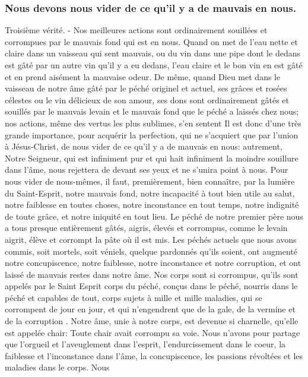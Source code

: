 \subsubsection{Nous devons nous vider de ce qu'il y a de mauvais en nous.}
 Troisième vérité. - Nos meilleures actions sont ordinairement souillées et corrompues par le mauvais fond qui
est en nous. Quand on met de l'eau nette et claire dans un vaisseau qui sent mauvais, ou du vin dans une pipe
dont le dedans est gâté par un autre vin qu'il y a eu dedans, l'eau claire et le bon vin en est gâté et en prend
aisément la mauvaise odeur. De même, quand Dieu met dans le vaisseau de notre âme gâté par le péché originel
et actuel, ses grâces et rosées célestes ou le vin délicieux de son amour, ses dons sont ordinairement gâtés et
souillés par le mauvais levain et le mauvais fond que le péché a laissés chez nous; nos actions, même des vertus
les plus sublimes, s'en sentent Il est donc d'une très grande importance, pour acquérir la perfection, qui ne
s'acquiert que par l'union à Jésus-Christ, de nous vider de ce qu'il y a de mauvais en nous: autrement, Notre
Seigneur, qui est infiniment pur et qui hait infiniment la moindre souillure dans l'âme, nous rejettera de devant ses
yeux et ne s'unira point à nous.
 Pour nous vider de nous-mêmes, il faut, premièrement, bien connaître, par la lumière du Saint-Esprit, notre
mauvais fond, notre incapacité à tout bien utile au salut, notre faiblesse en toutes choses, notre inconstance en
tout temps, notre indignité de toute grâce, et notre iniquité en tout lieu. Le péché de notre premier père nous a tous
presque entièrement gâtés, aigris, élevés et corrompus, comme le levain aigrit, élève et corrompt la pâte où il est
mis. Les péchés actuels que nous avons commis, soit mortels, soit véniels, quelque pardonnés qu'ils soient, ont
augmenté notre concupiscence, notre faiblesse, notre inconstance et notre corruption, et ont laissé de mauvais
restes dans notre âme.
Nos corps sont si corrompus, qu'ils sont appelés par le Saint Esprit corps du péché, conçus dans le péché, nourris
dans le péché et capables de tout, corps sujets à mille et mille maladies, qui se corrompent de jour en jour, et qui
n'engendrent que de la gale, de la vermine et de la corruption .
Notre âme, unie à notre corps, est devenue si charnelle, qu'elle est appelée chair: Toute chair avait corrompu sa
voie. Nous n'avons pour partage que l'orgueil et l'aveuglement dans l'esprit, l'endurcissement dans le coeur, la
faiblesse et l'inconstance dans l'âme, la concupiscence, les passions révoltées et les maladies dans le corps. Nous
